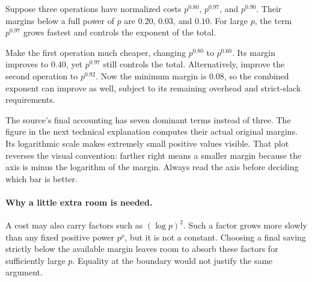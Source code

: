 
Suppose three operations have normalized costs $p^{0.80}$, $p^{0.97}$,
and $p^{0.90}$. Their margins below a full power of $p$ are $0.20$,
$0.03$, and $0.10$. For large $p$, the term $p^{0.97}$ grows fastest
and controls the exponent of the total.

Make the first operation much cheaper, changing $p^{0.80}$ to $p^{0.60}$.
Its margin improves to $0.40$, yet $p^{0.97}$ still controls the total.
Alternatively, improve the second operation to $p^{0.92}$. Now the minimum
margin is $0.08$, so the combined exponent can improve as well, subject
to its remaining overhead and strict-slack requirements.


The source's final accounting has seven dominant terms instead of three.
The figure in the next technical explanation computes their actual original
margins. Its logarithmic scale makes extremely small positive values visible.
That plot reverses the visual convention: farther right means a smaller
margin because the axis is minus the logarithm of the margin. Always read
the axis before deciding which bar is better.

\paragraph{Why a little extra room is needed.}
A cost may also carry factors such as $(\log p)^2$. Such a factor grows
more slowly than any fixed positive power $p^\rho$, but it is not a
constant. Choosing a final saving strictly below the available margin leaves
room to absorb these factors for sufficiently large $p$. Equality at the
boundary would not justify the same argument.

